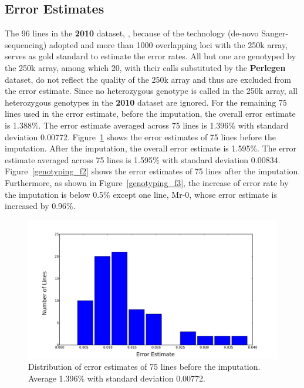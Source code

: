 \documentclass[a4paper,10pt]{article}
\begin{document}
\subsection{Error Estimates}

The 96 lines in the \textbf{2010} dataset, \cite{Nordborg2005}, because of the technology (de-novo Sanger-sequencing) adopted and more than 1000 overlapping loci with the 250k array, serves as gold standard to estimate the error rates. All but one are genotyped by the 250k array, among which 20, with their calls substituted by the \textbf{Perlegen} dataset, do not reflect the quality of the 250k array and thus are excluded from the error estimate. Since no heterozygous genotype is called in the 250k array, all heterozygous genotypes in the \textbf{2010} dataset are ignored. For the remaining 75 lines used in the error estimate, before the imputation, the overall error estimate is 1.388\%. The error estimate averaged across 75 lines is 1.396\% with standard deviation 0.00772. Figure~\ref{genotyping_f1} shows the error estimates of 75 lines before the imputation. After the imputation, the overall error estimate is 1.595\%. The error estimate averaged across 75 lines is 1.595\% with standard deviation 0.00834. Figure~\ref{genotyping_f2} shows the error estimates of 75 lines after the imputation. Furthermore, as shown in Figure~\ref{genotyping_f3}, the increase of error rate by the imputation is below 0.5\% except one line, Mr-0, whose error estimate is increased by 0.96\%.

\begin{figure}
  \includegraphics[width=1.0\textwidth]{figures/call_method_35_vs_2010_mismatch_rate_hist.png}
  \caption{Distribution of error estimates of 75 lines before the imputation. Average 1.396\% with standard deviation 0.00772.}\label{genotyping_f1}
\end{figure}
\end{document}
